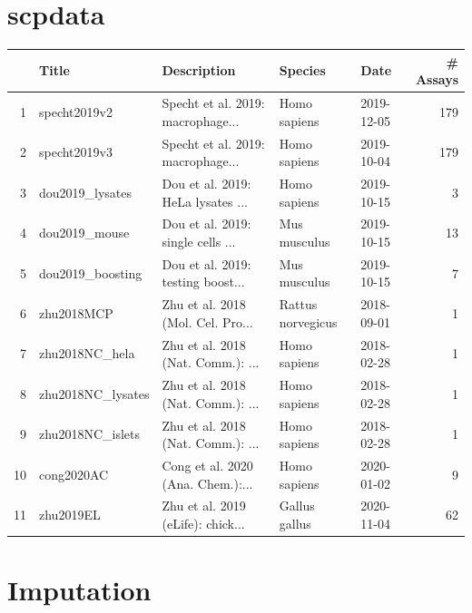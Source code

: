 \documentclass{article}
\newcommand{\hcode}[2][lgray]{{\ttfamily\color{vdgray}\colorbox{#1}{#2}}}
\begin{document}
\begin{multicols}{2}
\begin{minipage}[t]{\linewidth}
  \section*{\huge \hcode{scpdata}}
    \centering
    \scriptsize
    \begin{tabular}{rllllr}
      \hline
     & Title & Description & Species & Date & \# Assays \\ 
      \hline
    1 & specht2019v2 & Specht et al. 2019: macrophage... & Homo sapiens & 2019-12-05 & 179 \\ 
      2 & specht2019v3 & Specht et al. 2019: macrophage... & Homo sapiens & 2019-10-04 & 179 \\ 
      3 & dou2019\_lysates & Dou et al. 2019: HeLa lysates
    ... & Homo sapiens & 2019-10-15 &   3 \\ 
      4 & dou2019\_mouse & Dou et al. 2019: single cells ... & Mus musculus & 2019-10-15 &  13 \\ 
      5 & dou2019\_boosting & Dou et al. 2019: testing boost... & Mus musculus & 2019-10-15 &   7 \\ 
      6 & zhu2018MCP & Zhu et al. 2018 (Mol. Cel. Pro... & Rattus norvegicus & 2018-09-01 &   1 \\ 
      7 & zhu2018NC\_hela & Zhu et al. 2018 (Nat. Comm.): ... & Homo sapiens & 2018-02-28 &   1 \\ 
      8 & zhu2018NC\_lysates & Zhu et al. 2018 (Nat. Comm.): ... & Homo sapiens & 2018-02-28 &   1 \\ 
      9 & zhu2018NC\_islets & Zhu et al. 2018 (Nat. Comm.): ... & Homo sapiens & 2018-02-28 &   1 \\ 
      10 & cong2020AC & Cong et al. 2020 (Ana. Chem.):... & Homo sapiens & 2020-01-02 &   9 \\ 
      11 & zhu2019EL & Zhu et al. 2019 (eLife): chick... & Gallus gallus & 2020-11-04 &  62 \\ 
       \hline
    \end{tabular}
\end{minipage}

\noindent
\begin{minipage}[t]{\linewidth}
  \vspace{0.5cm}
  \section*{\huge Imputation}
  

\end{minipage}
\end{multicols}
\end{document}

